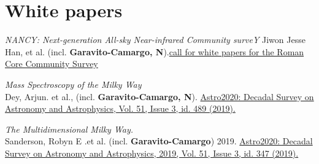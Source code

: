 \documentclass[14pt]{article}
\begin{document}
\section*{White papers}

\begin{etaremune}
  \setcounter{enumi}{4}
\item \textit{NANCY: Next-generation All-sky Near-infrared Community surveY}
  Jiwon Jesse Han, et al. (incl. \textbf{Garavito-Camargo,
  N}).\href{https://arxiv.org/abs/2306.11784}{call for white papers for the
  Roman Core Community Survey}
\item \textit{Mass Spectroscopy of the Milky Way} \\
  Dey, Arjun. et al., (incl. \textbf{Garavito-Camargo, N}).
  \href{https://113qx216in8z1kdeyi404hgf-wpengine.netdna-ssl.com/wp-content/uploads/2019/05/489_dey.pdf}{Astro2020: Decadal
  Survey on Astronomy and Astrophysics, Vol. 51, Issue 3, id. 489 (2019).}
\item \textit{The Multidimensional Milky Way.}\\
 Sanderson, Robyn E .et al. (incl. \textbf{Garavito-Camargo}) 2019.
  \href{https://arxiv.org/abs/1909.07641}{Astro2020: Decadal Survey on
Astronomy and Astrophysics, 2019, Vol. 51, Issue 3, id. 347 (2019).} 
\end{etaremune}
\end{document}
